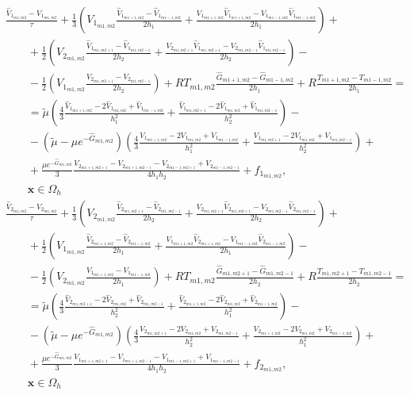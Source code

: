 \documentclass[a4paper]{article}
\theoremstyle{definition}
\numberwithin{equation}{section}
\begin{document}
\begin{eqnarray}\nonumber
& \frac{\hat{V}_{1_{m1,m2}} - V_{1_{m1,m2}}}{\tau} + \frac{1}{3}\left( V_{1_{m1,m2}} \frac{\hat{V}_{1_{m1+1,m2}} - \hat{V}_{1_{m1-1,m2}}}{2h_1} + \frac{V_{1_{m1+1,m2}}\hat{V}_{1_{m1+1,m2}} - V_{1_{m1-1,m2}}\hat{V}_{1_{m1-1,m2}}}{2h_1} \right) + \\ \nonumber
& \qquad + \frac{1}{2} \left( V_{2_{m1,m2}}\frac{\hat{V}_{1_{m1,m2+1}} - \hat{V}_{1_{m1,m2-1}}}{2h_2} + \frac{V_{2_{m1,m2+1}}\hat{V}_{1_{m1,m2+1}} - V_{2_{m1,m2-1}}\hat{V}_{1_{m1,m2-1}}}{2h_2}\right) -\\ \nonumber
& \qquad - \frac{1}{2}\left( V_{1_{m1,m2}}\frac{V_{2_{m1,m2+1}} - V_{2_{m1,m2-1}}}{2h_2}\right) + RT_{m1,m2}\frac{\hat{G}_{m1+1,m2} - \hat{G}_{m1-1,m2}}{2h_1} + R\frac{T_{m1+1,m2} - T_{m1-1,m2}}{2h_1} = \\ \nonumber
& \qquad = \tilde{\mu}\left( \frac{4}{3}\frac{\hat{V}_{1_{m1+1,m2}} - 2\hat{V}_{1_{m1,m2}} + \hat{V}_{1_{m1-1,m2}}}{h_1^2} + \frac{\hat{V}_{1_{m1,m2+1}} - 2\hat{V}_{1_{m1,m2}} + \hat{V}_{1_{m1,m2-1}}}{h_2^2} \right) - \\ \nonumber
& \qquad - (\tilde{\mu} - \mu e^{-\hat{G}_{m1,m2}})\left( \frac{4}{3}\frac{V_{1_{m1+1,m2}} - 2V_{1_{m1,m2}} + V_{1_{m1-1,m2}}}{h_1^2} + \frac{V_{1_{m1,m2+1}} - 2V_{1_{m1,m2}} + V_{1_{m1,m2-1}}}{h_2^2} \right) + \\
& \qquad + \frac{\mu e^{-\hat{G}_{m1,m2}}}{3}\frac{V_{2_{m1+1,m2+1}} - V_{2_{m1+1,m2-1}} - V_{2_{m1-1,m2+1}} + V_{2_{m1-1,m2-1}}}{4h_1h_2} + f_{1_{m1,m2}}, \\ \nonumber
& \qquad \textbf{x}\in\Omega_h
\end{eqnarray}
\begin{eqnarray}\nonumber
& \frac{\hat{V}_{2_{m1,m2}} - V_{2_{m1,m2}}}{\tau} + \frac{1}{3}\left( V_{2_{m1,m2}} \frac{\hat{V}_{2_{m1,m2+1}} - \hat{V}_{2_{m1,m2-1}}}{2h_2} + \frac{V_{2_{m1,m2+1}}\hat{V}_{2_{m1,m2+1}} - V_{2_{m1,m2-1}}\hat{V}_{2_{m1,m2-1}}}{2h_2} \right) + \\ \nonumber
& \qquad + \frac{1}{2} \left( V_{1_{m1,m2}}\frac{\hat{V}_{2_{m1+1,m2}} - \hat{V}_{2_{m1-1,m2}}}{2h_1} + \frac{V_{1_{m1+1,m2}}\hat{V}_{2_{m1+1,m2}} - V_{1_{m1-1,m2}}\hat{V}_{2_{m1-1,m2}}}{2h_1}\right) -\\ \nonumber
& \qquad - \frac{1}{2}\left( V_{2_{m1,m2}}\frac{V_{1_{m1+1,m2}} - V_{1_{m1-1,m2}}}{2h_1}\right) + RT_{m1,m2}\frac{\hat{G}_{m1,m2+1} - \hat{G}_{m1,m2-1}}{2h_2} + R\frac{T_{m1,m2+1} - T_{m1,m2-1}}{2h_2} = \\ \nonumber
& \qquad = \tilde{\mu}\left( \frac{4}{3}\frac{\hat{V}_{2_{m1,m2+1}} - 2\hat{V}_{2_{m1,m2}} + \hat{V}_{2_{m1,m2-1}}}{h_2^2} + \frac{\hat{V}_{2_{m1+1,m2}} - 2\hat{V}_{2_{m1,m2}} + \hat{V}_{2_{m1-1,m2}}}{h_1^2}  \right) - \\ \nonumber
& \qquad - (\tilde{\mu} - \mu e^{-\hat{G}_{m1,m2}})\left( \frac{4}{3}\frac{V_{2_{m1,m2+1}} - 2V_{2_{m1,m2}} + V_{2_{m1,m2-1}}}{h_2^2} + \frac{V_{2_{m1+1,m2}} - 2V_{2_{m1,m2}} + V_{2_{m1-1,m2}}}{h_1^2} \right) + \\
& \qquad + \frac{\mu e^{-\hat{G}_{m1,m2}}}{3}\frac{V_{1_{m1+1,m2+1}} - V_{1_{m1+1,m2-1}} - V_{1_{m1-1,m2+1}} + V_{1_{m1-1,m2-1}}}{4h_1h_2} + f_{2_{m1,m2}}, \\ \nonumber
& \qquad \textbf{x}\in\Omega_h
\end{eqnarray}
\end{document}
